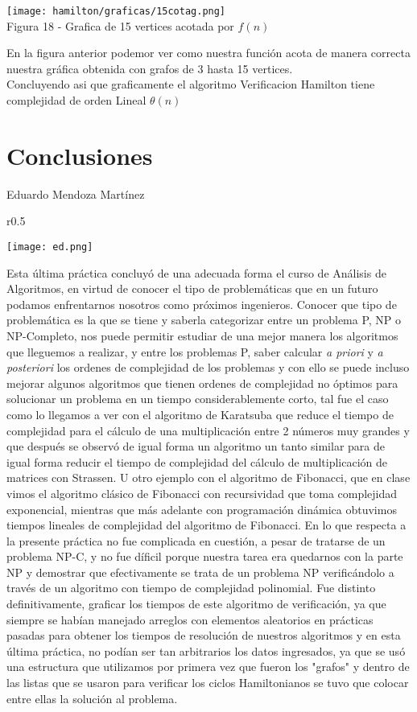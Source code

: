 \documentclass[12pt,twoside]{article}
\begin{document}
\begin{center}
    \texttt{[image: hamilton/graficas/15cotag.png]}\\
    Figura 18 - Grafica de 15 vertices acotada por $f(n)$
\end{center}
En la figura anterior podemor ver como nuestra función acota de manera correcta nuestra gráfica obtenida con grafos de 3 hasta 15 vertices.\\
Concluyendo asi que graficamente el algoritmo Verificacion Hamilton tiene complejidad de orden Lineal $\theta{(n)}$

\newpage
\section{Conclusiones}
Eduardo Mendoza Martínez\newline
\begin{wrapfigure}{r}{0.5\textwidth}
  \begin{center}
    \texttt{[image: ed.png]}
  \end{center}

\end{wrapfigure}
Esta última práctica concluyó de una adecuada forma el curso de Análisis de Algoritmos, en virtud de conocer el tipo de problemáticas que en un futuro podamos enfrentarnos nosotros como próximos ingenieros. Conocer que tipo de problemática es la que se tiene y saberla categorizar entre un problema P, NP o NP-Completo, nos puede permitir estudiar de una mejor manera los algoritmos que lleguemos a realizar, y entre los problemas P, saber calcular \textit{a priori} y \textit{a posteriori} los ordenes de complejidad de los problemas y con ello se puede incluso mejorar algunos algoritmos que tienen ordenes de complejidad no óptimos para solucionar un problema en un tiempo considerablemente corto, tal fue el caso como lo llegamos a ver con el algoritmo de Karatsuba que reduce el tiempo de complejidad para el cálculo de una multiplicación entre 2 números muy grandes y que después se observó de igual forma un algoritmo un tanto similar para de igual forma reducir el tiempo de complejidad del cálculo de multiplicación de matrices con Strassen. U otro ejemplo con el algoritmo de Fibonacci, que en clase vimos el algoritmo clásico de Fibonacci con recursividad que toma complejidad exponencial, mientras que más adelante con programación dinámica obtuvimos tiempos lineales de complejidad del algoritmo de Fibonacci. En lo que respecta a la presente práctica no fue complicada en cuestión, a pesar de tratarse de un problema NP-C, y no fue díficil porque nuestra tarea era quedarnos con la parte NP y demostrar que efectivamente se trata de un problema NP verificándolo a través de un algoritmo con tiempo de complejidad polinomial. Fue distinto definitivamente, graficar los tiempos de este algoritmo de verificación, ya que siempre se habían manejado arreglos con elementos aleatorios en prácticas pasadas para obtener los tiempos de resolución de nuestros algoritmos y en esta última práctica, no podían ser tan arbitrarios los datos ingresados, ya que se usó una estructura que utilizamos por primera vez que fueron los "grafos" y dentro de las listas que se usaron para verificar los ciclos Hamiltonianos se tuvo que colocar entre ellas la solución al problema.
\end{document}
